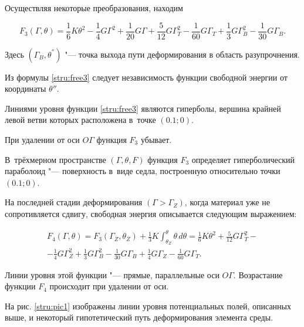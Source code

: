Осуществляя некоторые преобразования, находим

\begin{equation}

\!

F_3(\Gamma, \theta)=

\frac16 K\theta^2 -\frac14 G\Gamma^2+ \frac1{20} G\Gamma+\frac{5}{12}G\Gamma_T^2-\frac{1}{60}G\Gamma_T+ %


\frac13 G\Gamma_B^2-\frac{1}{30} G\Gamma_B. \! \label{stru:free3}

\end{equation}

Здесь $(\Gamma_B,\theta^{''})$ "--- точка выхода пути деформирования в область разупрочнения. 

Из формулы \eqref{stru:free3} следует независимость функции свободной энергии от координаты $\theta''$. 

Линиями уровня функции \eqref{stru:free3} являются гиперболы, вершина крайней левой ветви которых расположена в~точке $(0.1; 0)$. 

При удалении от оси $O\Gamma$ функция $F_3$ убывает. 

В~трёхмерном пространстве $(\Gamma,\theta,F)$ функция $F_3$ определяет гиперболический параболоид "--- поверхность в~виде седла, построенную относительно точки $(0.1; 0)$.





На последней стадии деформирования $(\Gamma>\Gamma_Z)$, когда материал уже не сопротивляется сдвигу, свободная энергия описывается следующим выражением:

\begin{multline}

F_4(\Gamma, \theta)=F_3(\Gamma_Z,\theta_Z)+\frac13 K\int_{\theta_{Z}}^\theta \theta\,d\theta=\frac16 K\theta^2+\frac{5}{12}G\Gamma_T^2-\\

-\frac14 G\Gamma_Z^2+\frac13 G\Gamma_B^2-\frac{1}{30}G\Gamma_B+\frac14 G\Gamma_Z-\frac{1}{60}G\Gamma_T. 

\end{multline}

Линии уровня этой функции "--- прямые, параллельные оси $O\Gamma$. Возрастание функции $F_4$ происходит при удалении от оси.



На рис. \ref{stru:pic1} изображены линии уровня потенциальных полей, описанных выше, и некоторый гипотетический путь деформирования элемента среды.








